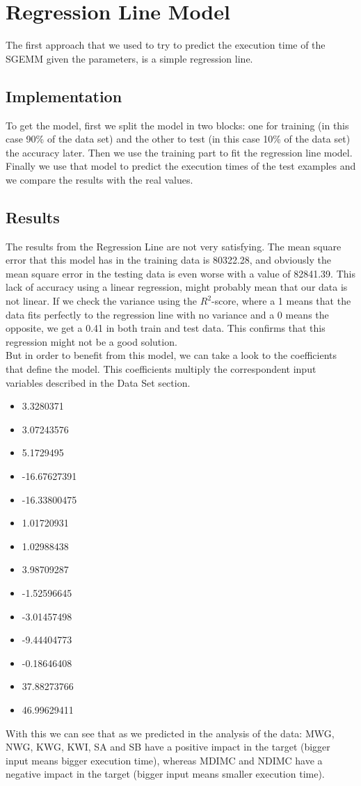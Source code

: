 \documentclass[sigconf,authorversion]{acmart}
\begin{document}
\section{Regression Line Model}
The first approach that we used to try to predict the execution time of the SGEMM given the parameters, is a simple regression line.
\subsection{Implementation}
To get the model, first we split the model in two blocks: one for training (in this case 90\% of the data set) and the other to test (in this case 10\% of the data set) the accuracy later. Then we use the training part to fit the regression line model. Finally we use that model to predict the execution times of the test examples and we compare the results with the real values.
\subsection{Results}
The results from the Regression Line are not very satisfying. The mean square error that this model has in the training data is 80322.28, and obviously the mean square error in the testing data is even worse with a value of 82841.39. This lack of accuracy using a linear regression, might probably mean that our data is not linear. If we check the variance using the $R^2$-score, where a 1 means that the data fits perfectly to the regression line with no variance and a 0 means the opposite, we get a 0.41 in both train and test data. This confirms that this regression might not be a good solution.\\
But in order to benefit from this model, we can take a look to the coefficients that define the model. This coefficients multiply the correspondent input variables described in the Data Set section.
\begin{itemize}
  \item 3.3280371
  \item 3.07243576
  \item 5.1729495
  \item -16.67627391
  \item -16.33800475
  \item 1.01720931
  \item 1.02988438
  \item 3.98709287
  \item -1.52596645
  \item -3.01457498
  \item -9.44404773
  \item -0.18646408
  \item 37.88273766
  \item 46.99629411
\end{itemize}
With this we can see that as we predicted in the analysis of the data: MWG, NWG, KWG, KWI, SA and SB have a positive impact in the target (bigger input means bigger execution time), whereas MDIMC and NDIMC have a negative impact in the target (bigger input means smaller execution time).
\end{document}
